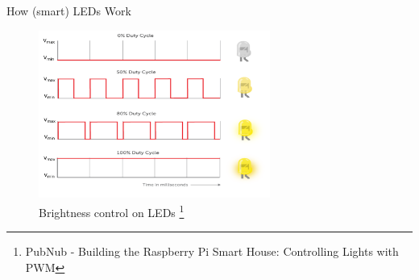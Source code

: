 \documentclass[11pt,t,usepdftitle=false,aspectratio=169]{beamer}
\begin{document}
\begin{frame}{How (smart) LEDs Work}
{        \begin{figure}
            \centering
            \includegraphics[height=5.5cm,keepaspectratio]{img/pwm-duty-cycle.png}
            \caption{\small{Brightness control on LEDs} \footnote{\tiny{PubNub - Building the Raspberry Pi Smart House: Controlling Lights with PWM}}}
        \end{figure}
    }
\end{frame}
\end{document}
